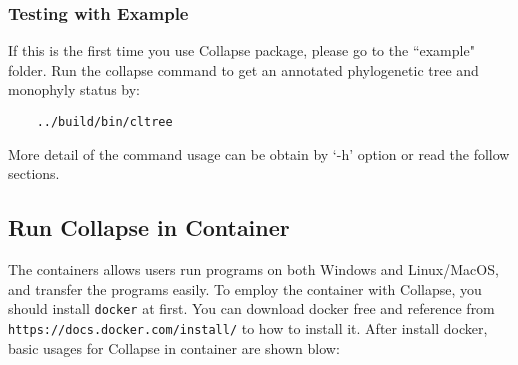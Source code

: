 \documentclass[12pt,a4paper]{article}
\begin{document}
\subsubsection{Testing with Example}
If this is the first time you use Collapse package, please go to the ``example" folder. Run the collapse command to get an annotated phylogenetic tree and monophyly status by:


\begin{verbatim}
    ../build/bin/cltree
\end{verbatim}
More detail of the command usage can be obtain by `-h' option or read the follow sections.

\subsection{Run Collapse in Container} 

The containers allows users run programs on both Windows and Linux/MacOS, and transfer the programs easily. To employ the container with Collapse, you should install {\tt docker} at first. You can download docker free and reference from {\tt https://docs.docker.com/install/} to how to install it. After install docker, basic usages for Collapse in container are shown blow:
\end{document}
